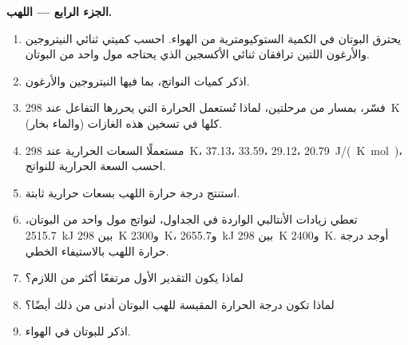\begin{problem}
\medskip
\noindent\textbf{الجزء الرابع --- اللهب.}
\begin{enumerate}[resume]
  \item يحترق البوتان في الكمية الستوكيومترية من الهواء. احسب كميتي
        ثنائي النيتروجين والأرغون اللتين ترافقان ثنائي الأكسجين الذي
        يحتاجه مول واحد من البوتان.
  \item اذكر كميات النواتج، بما فيها النيتروجين والأرغون.
  \item فسّر، بمسار من مرحلتين، لماذا تُستعمل الحرارة التي يحررها
        التفاعل عند \qty{298}{K} (والماء بخار) كلها في تسخين هذه
        الغازات.
  \item مستعملًا السعات الحرارية عند \qty{298}{K}،  37.13،
         33.59،  29.12،  \qty{20.79}{J/(K.mol)}،
        احسب السعة الحرارية للنواتج.
  \item استنتج درجة حرارة اللهب بسعات حرارية ثابتة.
  \item تعطي زيادات الأنتالبي الواردة في الجداول، لنواتج مول واحد من
        البوتان، \qty{2515.7}{kJ} بين \qty{298}{K} و\qty{2300}{K}،
        و\qty{2655.7}{kJ} بين \qty{298}{K} و\qty{2400}{K}. أوجد درجة
        حرارة اللهب بالاستيفاء الخطي.
  \item لماذا يكون التقدير الأول مرتفعًا أكثر من اللازم؟
  \item لماذا تكون درجة الحرارة المقيسة للهب البوتان أدنى من ذلك أيضًا؟
  \item اذكر  للبوتان في الهواء.
\end{enumerate}
\end{problem}
